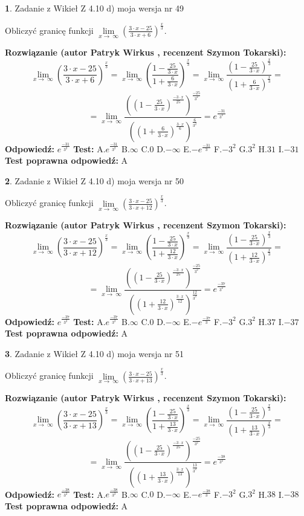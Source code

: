 \documentclass[12pt, a4paper]{article}
\theoremstyle{definition} %
\newtheorem{zad}{}
\newcommand{\zadStart}[1]{\begin{zad}#1\newline}
\newcommand{\zadStop}{\end{zad}}
\newcommand{\rozwStart}[2]{\noindent \textbf{Rozwiązanie (autor #1 , recenzent #2): }\newline}
\newcommand{\rozwStop}{\newline}
\newcommand{\odpStart}{\noindent \textbf{Odpowiedź:}\newline}
\newcommand{\odpStop}{\newline}
\newcommand{\testStart}{\noindent \textbf{Test:}\newline}
\newcommand{\testStop}{\newline}
\newcommand{\kluczStart}{\noindent \textbf{Test poprawna odpowiedź:}\newline}
\newcommand{\kluczStop}{\newline}
\begin{document}
\zadStart{Zadanie z Wikieł Z 4.10 d) moja wersja nr 49}


Obliczyć granicę funkcji  $\lim\limits_{x\to\ \infty}(\frac{3\cdot x-25}{3\cdot x+6})^{\frac{x}{3}}$.
\zadStop
\rozwStart{Patryk Wirkus}{Szymon Tokarski}
$$\lim\limits_{x\to\ \infty}(\frac{3\cdot x-25}{3\cdot x+6})^{\frac{x}{3}} = \lim\limits_{x\to\ \infty}(\frac{1-\frac{25}{3\cdot x}}{1+\frac{6}{3\cdot x}})^{\frac{x}{3}}=\lim\limits_{x\to\ \infty}\frac{(1-\frac{25}{3\cdot x})^{\frac{x}{3}}}{(1+\frac{6}{3\cdot x})^{\frac{x}{3}}}=$$
$$=\lim\limits_{x\to\ \infty}\frac{((1-\frac{25}{3\cdot x})^{\frac{-3\cdot x}{25}})^{\frac{-25}{3^{2}}}}{((1+\frac{6}{3\cdot x})^{\frac{3\cdot x}{6}})^{\frac{6}{3^{2}}}}=e^{\frac{-31}{3^{2}}}$$
\rozwStop
\odpStart
$e^{\frac{-31}{3^{2}}}$
\odpStop
\testStart
A.$e^{\frac{-31}{3^{2}}}$ B.$\infty$ C.$0$ D.$-\infty$ E.$-e^{\frac{-31}{3}}$
F.$-3^{2}$ G.$3^{2}$
H.$31$
I.$-31$
\testStop
\kluczStart
A
\kluczStop



\zadStart{Zadanie z Wikieł Z 4.10 d) moja wersja nr 50}


Obliczyć granicę funkcji  $\lim\limits_{x\to\ \infty}(\frac{3\cdot x-25}{3\cdot x+12})^{\frac{x}{3}}$.
\zadStop
\rozwStart{Patryk Wirkus}{Szymon Tokarski}
$$\lim\limits_{x\to\ \infty}(\frac{3\cdot x-25}{3\cdot x+12})^{\frac{x}{3}} = \lim\limits_{x\to\ \infty}(\frac{1-\frac{25}{3\cdot x}}{1+\frac{12}{3\cdot x}})^{\frac{x}{3}}=\lim\limits_{x\to\ \infty}\frac{(1-\frac{25}{3\cdot x})^{\frac{x}{3}}}{(1+\frac{12}{3\cdot x})^{\frac{x}{3}}}=$$
$$=\lim\limits_{x\to\ \infty}\frac{((1-\frac{25}{3\cdot x})^{\frac{-3\cdot x}{25}})^{\frac{-25}{3^{2}}}}{((1+\frac{12}{3\cdot x})^{\frac{3\cdot x}{12}})^{\frac{12}{3^{2}}}}=e^{\frac{-37}{3^{2}}}$$
\rozwStop
\odpStart
$e^{\frac{-37}{3^{2}}}$
\odpStop
\testStart
A.$e^{\frac{-37}{3^{2}}}$ B.$\infty$ C.$0$ D.$-\infty$ E.$-e^{\frac{-37}{3}}$
F.$-3^{2}$ G.$3^{2}$
H.$37$
I.$-37$
\testStop
\kluczStart
A
\kluczStop



\zadStart{Zadanie z Wikieł Z 4.10 d) moja wersja nr 51}


Obliczyć granicę funkcji  $\lim\limits_{x\to\ \infty}(\frac{3\cdot x-25}{3\cdot x+13})^{\frac{x}{3}}$.
\zadStop
\rozwStart{Patryk Wirkus}{Szymon Tokarski}
$$\lim\limits_{x\to\ \infty}(\frac{3\cdot x-25}{3\cdot x+13})^{\frac{x}{3}} = \lim\limits_{x\to\ \infty}(\frac{1-\frac{25}{3\cdot x}}{1+\frac{13}{3\cdot x}})^{\frac{x}{3}}=\lim\limits_{x\to\ \infty}\frac{(1-\frac{25}{3\cdot x})^{\frac{x}{3}}}{(1+\frac{13}{3\cdot x})^{\frac{x}{3}}}=$$
$$=\lim\limits_{x\to\ \infty}\frac{((1-\frac{25}{3\cdot x})^{\frac{-3\cdot x}{25}})^{\frac{-25}{3^{2}}}}{((1+\frac{13}{3\cdot x})^{\frac{3\cdot x}{13}})^{\frac{13}{3^{2}}}}=e^{\frac{-38}{3^{2}}}$$
\rozwStop
\odpStart
$e^{\frac{-38}{3^{2}}}$
\odpStop
\testStart
A.$e^{\frac{-38}{3^{2}}}$ B.$\infty$ C.$0$ D.$-\infty$ E.$-e^{\frac{-38}{3}}$
F.$-3^{2}$ G.$3^{2}$
H.$38$
I.$-38$
\testStop
\kluczStart
A
\kluczStop
\end{document}
